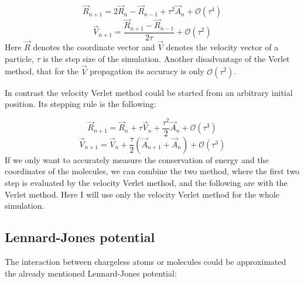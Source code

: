 \begin{multicols}{2}
\begin{equation}
\vec{R}_{n+1}
=
2 \vec{R}_{n} - \vec{R}_{n-1} + \tau^{2} \vec{A}_{n} + \mathcal{O} \left( \tau^{4} \right)
\end{equation}
\begin{equation}
\vec{V}_{n+1}
=
\frac{\vec{R}_{n+1} - \vec{R}_{n-1}}{2 \tau} +  \mathcal{O} \left( \tau^{2} \right)
\end{equation}
Here $\vec{R}$ denotes the coordinate vector and $\vec{V}$ denotes the velocity vector of a particle, $\tau$ is the step size of the simulation. Another disadvantage of the Verlet method, that for the $\vec{V}$ propagation its accuracy is only $\mathcal{O} \left( \tau^{2} \right)$. \par
In contrast the velocity Verlet method could be started from an arbitrary initial position. Its stepping rule is the following:

\begin{equation}
\vec{R}_{n+1}
=
\vec{R}_{n} + \tau \vec{V}_{n} + \frac{\tau^{2}}{2} \vec{A}_{n} + \mathcal{O} \left( \tau^{3} \right)
\end{equation}
\begin{equation}
\vec{V}_{n+1}
=
\vec{V}_{n} + \frac{\tau}{2} \left( \vec{A}_{n+1} + \vec{A}_{n} \right) + \mathcal{O} \left( \tau^{3} \right)
\end{equation}
If we only want to accurately measure the conservation of energy and the coordinates of the molecules, we can combine the two method, where the first two step is evaluated by the velocity Verlet method, and the following are with the Verlet method. Here I will use only the velocity Verlet method for the whole simulation.

\subsection{Lennard-Jones potential}
The interaction between chargeless atoms or molecules could be approximated the already mentioned Lennard-Jones potential:


\end{multicols}
